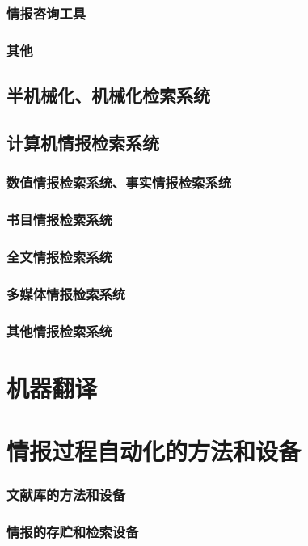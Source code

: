 \documentclass[UTF8]{../../ApplicationUniverse}
\begin{document}
        \subsubsection{情报咨询工具}
        \subsubsection{其他}
    \subsection{半机械化、机械化检索系统}
    \subsection{计算机情报检索系统}
        \subsubsection{数值情报检索系统、事实情报检索系统}
        \subsubsection{书目情报检索系统}
        \subsubsection{全文情报检索系统}
        \subsubsection{多媒体情报检索系统}
        \subsubsection{其他情报检索系统}

\section{机器翻译}
\section{情报过程自动化的方法和设备}
    \subsubsection{文献库的方法和设备}
    \subsubsection{情报的存贮和检索设备}
\end{document}
